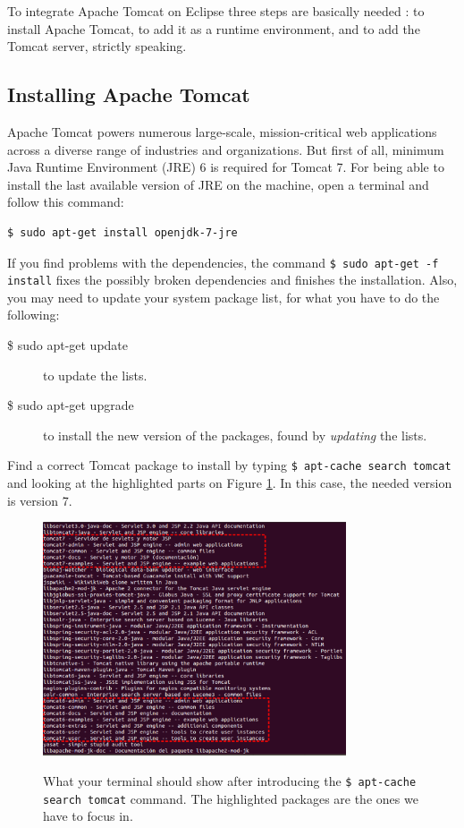 To integrate Apache Tomcat on Eclipse three steps are basically needed \cite{eclipsetomcat:site}: to install Apache Tomcat, to add it as a runtime environment, and to add the Tomcat server, strictly speaking.

\subsection{Installing Apache Tomcat}
\label{subsec:installapache}

Apache Tomcat powers numerous large-scale, mission-critical web applications across a diverse range of industries and organizations. But first of all, minimum Java Runtime Environment (JRE) 6 is required for Tomcat 7. For being able to install the last available version of JRE on the machine, open a terminal and follow this command:

\begin{verbatim}
$ sudo apt-get install openjdk-7-jre
\end{verbatim}

If you find problems with the dependencies, the command \texttt{\$ sudo apt-get -f install} fixes the possibly broken dependencies and finishes the installation. Also, you may need to update your system package list, for what you have to do the following:

\begin{description}
  \item[\$ sudo apt-get update] to update the lists.
  \item[\$ sudo apt-get upgrade] to install the new version of the packages, found by \textit{updating} the lists.
\end{description}

Find a correct Tomcat package to install by typing \texttt{\$ apt-cache search tomcat} and looking at the highlighted parts on Figure \ref{fig:tomcatpackages}. In this case, the needed version is version 7.

\begin{figure}
  \begin{center}
    \includegraphics[width=0.8\textwidth]{./Figures/tomcatpackages.png}
    \label{fig:tomcatpackages}
    \caption{What your terminal should show after introducing the \texttt{\$ apt-cache search tomcat} command. The highlighted packages are the ones we have to focus in.}
  \end{center}
\end{figure}

